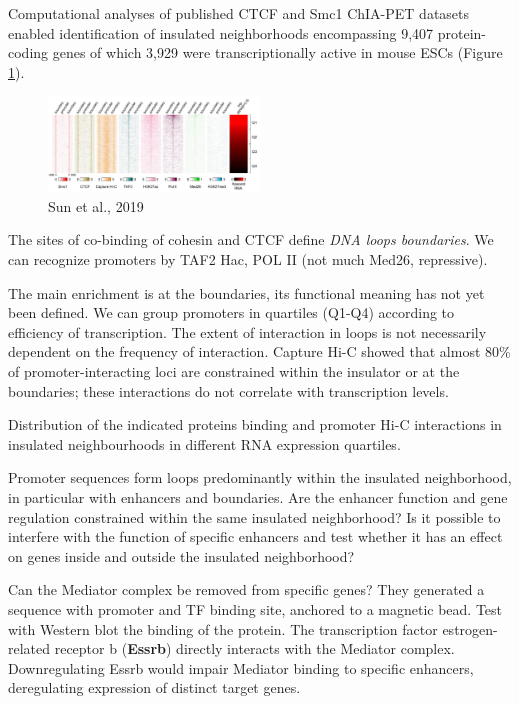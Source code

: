 Computational analyses of published CTCF and Smc1 ChIA-PET datasets enabled identification of insulated neighborhoods encompassing 9,407 protein-coding genes of which 3,929 were transcriptionally active in mouse ESCs (Figure \ref{fig:mouse}).

\begin{figure}
\centering
\includegraphics[width=0.5\textwidth]{../_resources/Screenshot_2022-10-19_at_10-01-09.png}
\caption{Sun et al., 2019}
\label{fig:mouse}
\end{figure}

The sites of co-binding of cohesin and CTCF define \emph{DNA loops boundaries}. We can recognize promoters by TAF2 Hac, POL II (not much Med26, repressive).

The main enrichment is at the boundaries, its functional meaning has not yet been defined. We can group promoters in quartiles (Q1-Q4) according to efficiency of transcription. The extent of interaction in loops is not necessarily dependent on the frequency of interaction. Capture Hi-C showed that almost 80\% of promoter-interacting loci are constrained within the insulator or at the boundaries; these interactions do not correlate with transcription levels.

Distribution of the indicated proteins binding and promoter Hi-C interactions in insulated neighbourhoods in different RNA expression quartiles.

Promoter sequences form loops predominantly within the insulated neighborhood, in particular with enhancers and boundaries. Are the enhancer function and gene regulation constrained within the same insulated neighborhood? Is it possible to interfere with the function of specific enhancers and test whether it has an effect on genes inside and outside the insulated neighborhood?

Can the Mediator complex be removed from specific genes? They generated a sequence with promoter and TF binding site, anchored to a magnetic bead. Test with Western blot the binding of the protein. The transcription factor estrogen-related receptor b (\textbf{Essrb}) directly interacts with the Mediator complex. Downregulating Essrb would impair Mediator binding to specific enhancers, deregulating expression of distinct target genes.

